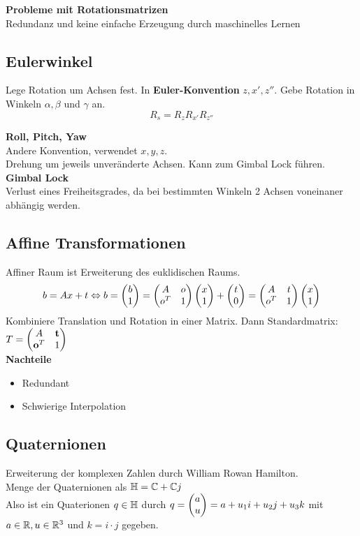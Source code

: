 \textbf{Probleme mit Rotationsmatrizen}\\
Redundanz und keine einfache Erzeugung durch maschinelles Lernen

\subsection{Eulerwinkel}
Lege Rotation um Achsen fest. In \textbf{Euler-Konvention} \(z, x', z''\).
Gebe Rotation in Winkeln \(\alpha, \beta\) und \(\gamma\) an.
\[ R_s = R_z R_{x'} R_{z''}\]

\textbf{Roll, Pitch, Yaw}\\
Andere Konvention, verwendet \(x, y, z\).\\
Drehung um jeweils unveränderte Achsen.
Kann zum Gimbal Lock führen.\\

\textbf{Gimbal Lock}\\
Verlust eines Freiheitsgrades, da bei bestimmten Winkeln 2 Achsen voneinaner abhängig werden.


\subsection{Affine Transformationen}
Affiner Raum ist Erweiterung des euklidischen Raums.
\begin{equation}
  b = Ax + t
    \Leftrightarrow
    b = \begin{pmatrix}b \\ 1\end{pmatrix} = \begin{pmatrix}A & o \\ o^T & 1\end{pmatrix} \begin{pmatrix}x \\ 1\end{pmatrix} + \begin{pmatrix}t \\ 0\end{pmatrix} =
    \begin{pmatrix}A & t \\ o^T & 1\end{pmatrix}\begin{pmatrix}x \\ 1\end{pmatrix}
\end{equation}
Kombiniere Translation und Rotation in einer Matrix. Dann Standardmatrix:
\(T = \begin{pmatrix}A & \mathbf{t} \\ \mathbf{o}^T & 1\end{pmatrix}\)\\

\textbf{Nachteile}
\begin{itemize}
\item Redundant
\item Schwierige Interpolation
\end{itemize}

\subsection{Quaternionen}
Erweiterung der komplexen Zahlen \complexnumbers durch William Rowan Hamilton.\\
Menge der Quaternionen \quaternionen als \( \mathbb{H} = \mathbb{C} + \mathbb{C} j\)\\
Also ist ein Quaterionen \(q \in \mathbb{H}\) durch \(q = \begin{pmatrix}a \\ u\end{pmatrix} = a + u_1 i + u_2 j + u_3 k\) 
mit \(a \in \mathbb{R}, u \in \mathbb{R}^3\) und \( k = i \cdot j\) gegeben.

